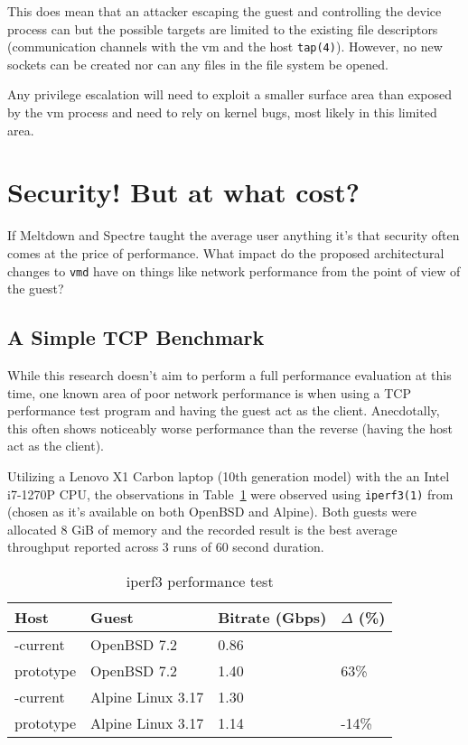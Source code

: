 \documentclass[conference]{IEEEtran}
\begin{document}
This does mean that an attacker escaping the guest and controlling the
device process can  but the possible targets
are limited to the existing file descriptors (communication channels
with the vm and the host \texttt{tap(4)}). However, no new sockets can
be created nor can any files in the file system be opened.

Any privilege escalation will need to exploit a smaller surface area
than exposed by the vm process and need to rely on kernel bugs, most
likely in this limited area.


\vspace{5mm}
\section{Security! But at what cost?}
If Meltdown and Spectre taught the average user anything it's that
security often comes at the price of performance. What impact do the
proposed architectural changes to \texttt{vmd} have on things like
network performance from the point of view of the guest?

\vspace{3mm}
\subsection{A Simple TCP Benchmark}
While this research doesn't aim to perform a full performance
evaluation at this time, one known area of poor network performance is
when using a TCP performance test program and having the guest act as
the client. Anecdotally, this often shows noticeably worse performance
than the reverse (having the host act as the client).

Utilizing a Lenovo X1 Carbon laptop (10th generation model) with the
an Intel i7-1270P CPU, the observations in Table~\ref{perf} were
observed using \texttt{iperf3(1)} from (chosen as it's available on
both OpenBSD and Alpine). Both guests were allocated 8 GiB of memory
and the recorded result is the best average throughput reported across
3 runs of 60 second duration.

\vspace{2mm}
\begin{table}
\begin{center}
\caption{\label{perf}iperf3 performance test}
\begin{tabular}{| l | l | p{1cm} | l |}
  \hline
  Host & Guest & Bitrate (Gbps) & $\Delta$ (\%) \\ \hline
  -current & OpenBSD 7.2 & 0.86 &  \\ \hline
  prototype & OpenBSD 7.2 & 1.40 & 63\% \\ \hline
  -current & Alpine Linux 3.17 & 1.30 &   \\ \hline
  prototype & Alpine Linux 3.17 & 1.14 & -14\%  \\ \hline
\end{tabular}
\end{center}
\end{table}
\vspace{2mm}
\end{document}
